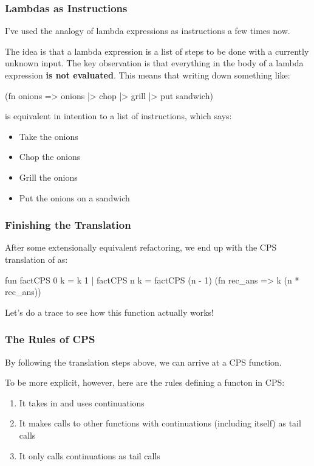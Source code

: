 \documentclass[aspectratio=169]{beamer}
\begin{document}
\begin{frame}[fragile]
  \frametitle{Lambdas as Instructions}

  I've used the analogy of lambda expressions as instructions a few times now.

  The idea is that a lambda expression is a list of steps to be done with a
  currently unknown input. The key observation is that everything in the body
  of a lambda expression \textbf{is not evaluated}. This means that writing
  down something like:

  \begin{codeblock}
    (fn onions => onions |> chop |> grill |> put sandwich) 
  \end{codeblock}

  is equivalent in intention to a list of instructions, which says:
  \begin{itemize}
    \item Take the onions 
    \item Chop the onions 
    \item Grill the onions 
    \item Put the onions on a sandwich 
  \end{itemize}
\end{frame}

\begin{frame}[fragile]
  \frametitle{Finishing the Translation}

  After some extensionally equivalent refactoring, we end up with the 
  CPS translation of  as:

  \begin{codeblock}
    fun factCPS 0 k = k 1
      | factCPS n k = 
        factCPS (n - 1) (fn rec_ans => k (n * rec_ans)) 
  \end{codeblock}

  Let's do a trace to see how this function actually works!
\end{frame}

\begin{frame}[fragile]
  \frametitle{The Rules of CPS}

  By following the translation steps above, we can arrive at a CPS function.

  To be more explicit, however, here are the rules defining a functon in CPS:


  \begin{enumerate}
    \item It takes in and uses continuations
    \item It makes calls to other functions with continuations (including itself)
    as tail calls
    \item It only calls continuations as tail calls 
  \end{enumerate}
\end{frame}
\end{document}
